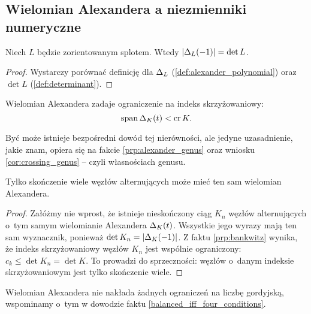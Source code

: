 
\subsection{Wielomian Alexandera a niezmienniki numeryczne}
\begin{proposition}
\label{prp:alexander_determinant}%
    Niech $L$ będzie zorientowanym splotem.
    Wtedy $|\Delta_L(-1)| = \det L$.
\end{proposition}

\begin{proof}
    Wystarczy porównać definicję dla $\Delta_L$ (\ref{def:alexander_polynomial}) oraz $\det L$ (\ref{def:determinant}).
\end{proof}

\begin{proposition}
    Wielomian Alexandera zadaje ograniczenie na indeks skrzyżowaniowy:
    \begin{equation}
        \operatorname{span} \Delta_K(t) < \operatorname{cr} K.
    \end{equation}
\end{proposition}

Być może istnieje bezpośredni dowód tej nierówności, ale jedyne uzasadnienie, jakie znam, opiera się na fakcie \ref{prp:alexander_genus} oraz wniosku \ref{cor:crossing_genus} -- czyli własnościach genusu.
%

\begin{proposition}
    Tylko skończenie wiele węzłów alternujących może mieć ten sam wielomian Alexandera.
\end{proposition}

\begin{proof}
    Załóżmy nie wprost, że istnieje nieskończony ciąg $K_n$ węzłów alternujących o~tym samym wielomianie Alexandera $\Delta_K(t)$.
    Wszystkie jego wyrazy mają ten sam wyznacznik, ponieważ $\det K_n = |\Delta_K(-1)|$.
    Z faktu \ref{prp:bankwitz} wynika, że indeks skrzyżowaniowy węzłów $K_n$ jest wspólnie ograniczony: $c_k \le \det K_n = \det K$.
    To prowadzi do sprzeczności: węzłów o~danym indeksie skrzyżowaniowym jest tylko skończenie wiele.
\end{proof}

Wielomian Alexandera nie nakłada żadnych ograniczeń na liczbę gordyjską, wspominamy o~tym w dowodzie faktu \ref{balanced_iff_four_conditions}.


